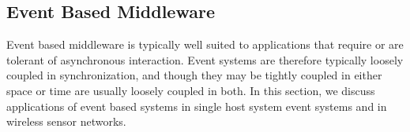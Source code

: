 \documentclass{acm_proc_article-sp}
\begin{document}






\subsection{Event Based Middleware}
\label{sec:appseb}


Event based middleware is typically well suited to applications that require or are tolerant of asynchronous interaction. Event systems are therefore typically loosely coupled in synchronization, and though they may be tightly coupled in either space or time are usually loosely coupled in both. In this section, we discuss applications of event based systems in single host system event systems and in wireless sensor networks.
\end{document}
